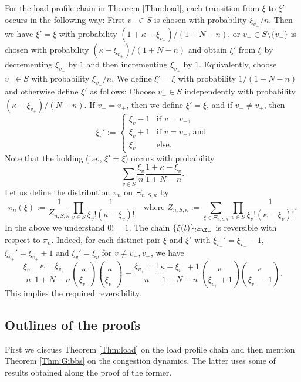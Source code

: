 \documentclass[12pt, reqno]{amsart}
\begin{document}
For the load profile chain in Theorem \ref{Thm:load},
each transition from $\xi$ to $\xi'$ occurs in the following way:
First $v_-\in S$ is chosen with probability $\xi_{v_-}/n$.
Then we have $\xi'=\xi$ with probability $(1+\kappa-\xi_{v_-})/(1+N-n)$,
or $v_+\in S\setminus\{v_-\}$ is chosen with probability
$(\kappa-\xi_{v_+})/(1+N-n)$ and obtain $\xi'$ from $\xi$ by decrementing $\xi_{v_-}$ by $1$ and then incrementing $\xi_{v_+}$ by $1$.
Equivalently, 
choose $v_-\in S$ with probability $\xi_{v_-}/n$.
We define $\xi'=\xi$ with probability $1/(1+N-n)$ and otherwise define $\xi'$ as follows:
Choose $v_+\in S$ independently with probability $(\kappa-\xi_{v_+})/(N-n)$.
If $v_-=v_+$, then we define $\xi'=\xi$, and if $v_-\neq v_+$,
then
\[
\xi_v':=
\begin{cases}
\xi_v-1 & \text{if $v=v_-$},\\
\xi_v+1 & \text{if $v=v_+$, and}\\
\xi_v & \text{else}.
\end{cases}
\]
Note that the holding (i.e., $\xi'=\xi$) occurs with probability
\[
\sum_{v \in S}\frac{\xi_v}{n}\frac{1+\kappa-\xi_v}{1+N-n}.
\]
Let us define the distribution $\pi_n$ on $\Xi_{n, S, \kappa}$ by
\[
\pi_n(\xi):=\frac{1}{Z_{n, S, \kappa}}\prod_{v \in S}\frac{1}{\xi_v !(\kappa-\xi_v)!} \quad \text{where $Z_{n,S,\kappa}:=\sum_{\xi \in \Xi_{n, S, \kappa}}\prod_{v \in S}\frac{1}{\xi_v!(\kappa-\xi_v)!}$}.
\]
In the above we understand $0!=1$.
The chain $\{\xi(t)\}_{t\in \Z_+}$ is reversible with respect to $\pi_n$.
Indeed, for each distinct pair $\xi$ and $\xi'$ with $\xi_{v_-}'=\xi_{v_-}-1$, 
$\xi_{v_+}'=\xi_{v_+}+1$ and $\xi_v'=\xi_v$ for $v \neq v_-, v_+$,
we have
\[
\frac{\xi_{v_-}}{n}\frac{\kappa-\xi_{v_+}}{1+N-n}{\kappa \choose \xi_{v_-}}{\kappa \choose \xi_{v_+}}
=\frac{\xi_{v_+}+1}{n}\frac{\kappa-\xi_{v_-}+1}{1+N-n}{\kappa \choose \xi_{v_+}+1}{\kappa \choose \xi_{v_-}-1}.
\]
This implies the required reversibility.

\subsection{Outlines of the proofs}

First we discuss Theorem \ref{Thm:load} on the load profile chain and then mention Theorem \ref{Thm:Gibbs} on the congestion dynamics.
The latter uses some of results obtained along the proof of the former.
\end{document}

